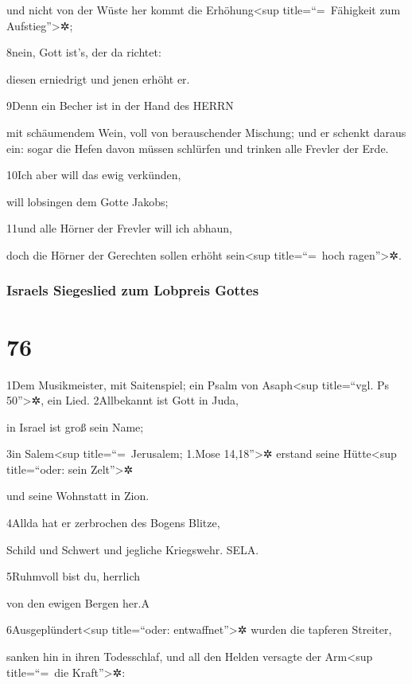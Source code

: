 und nicht von der Wüste her kommt die Erhöhung\textless sup
title=``=~Fähigkeit zum Aufstieg''\textgreater✲;

8nein, Gott ist's, der da richtet:

diesen erniedrigt und jenen erhöht er.

9Denn ein Becher ist in der Hand des HERRN

mit schäumendem Wein, voll von berauschender Mischung; und er schenkt
daraus ein: sogar die Hefen davon müssen schlürfen und trinken alle
Frevler der Erde.

10Ich aber will das ewig verkünden,

will lobsingen dem Gotte Jakobs;

11und alle Hörner der Frevler will ich abhaun,

doch die Hörner der Gerechten sollen erhöht sein\textless sup
title=``=~hoch ragen''\textgreater✲.

\hypertarget{israels-siegeslied-zum-lobpreis-gottes}{%
\subsubsection{Israels Siegeslied zum Lobpreis
Gottes}\label{israels-siegeslied-zum-lobpreis-gottes}}

\hypertarget{section-75}{%
\section{76}\label{section-75}}

1Dem Musikmeister, mit Saitenspiel; ein Psalm von Asaph\textless sup
title=``vgl. Ps 50''\textgreater✲, ein Lied. 2Allbekannt ist Gott in
Juda,

in Israel ist groß sein Name;

3in Salem\textless sup title=``=~Jerusalem; 1.Mose 14,18''\textgreater✲
erstand seine Hütte\textless sup title=``oder: sein Zelt''\textgreater✲

und seine Wohnstatt in Zion.

4Allda hat er zerbrochen des Bogens Blitze,

Schild und Schwert und jegliche Kriegswehr. SELA.

5Ruhmvoll bist du, herrlich

von den ewigen Bergen her.{A}

6Ausgeplündert\textless sup title=``oder: entwaffnet''\textgreater✲
wurden die tapferen Streiter,

sanken hin in ihren Todesschlaf, und all den Helden versagte der
Arm\textless sup title=``=~die Kraft''\textgreater✲:

